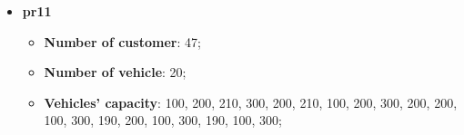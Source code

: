 \documentclass[main.tex]{subfiles}
\begin{document}
\begin{itemize}
    \item \textbf{pr11}
        \begin{itemize}
            \item \textbf{Number of customer}: 47;
            \item \textbf{Number of vehicle}: 20;
            \item \textbf{Vehicles' capacity}: 100, 200, 210, 300, 200, 210, 100, 200, 300, 200, 200, 100, 300, 190, 200, 100, 300, 190, 100, 300;
        \end{itemize}

\end{itemize}
\end{document}
